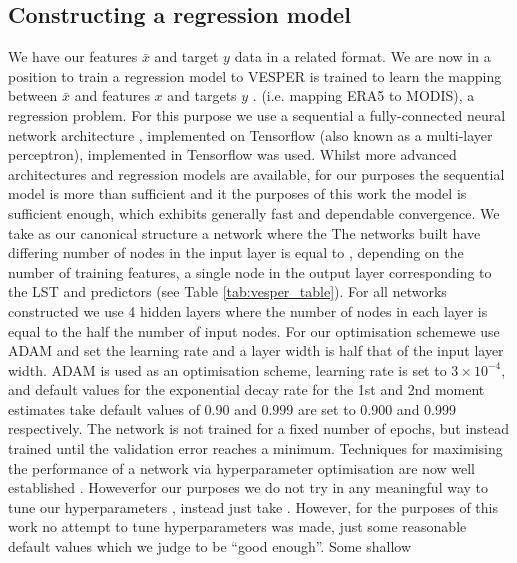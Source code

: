 \documentclass[hess, twostagejnl]{copernicus}
\providecommand{\DIFadd}[1]{{\protect\color{blue} \sf #1}} %
\providecommand{\DIFdel}[1]{{\protect\color{red} \scriptsize #1}} %
\providecommand{\DIFaddbegin}{} %
\providecommand{\DIFaddend}{} %
\providecommand{\DIFdelbegin}{} %
\providecommand{\DIFdelend}{} %
\begin{document}
\subsection{Constructing a regression model}
\DIFdelbegin \DIFdel{We have our features $\bar{x}$ and target $y$ data in a related format. We are now in a position to train a regression model to }\DIFdelend \DIFaddbegin \DIFadd{VESPER is trained to }\DIFaddend learn the mapping between \DIFdelbegin \DIFdel{$\bar{x}$ and }\DIFdelend \DIFaddbegin \DIFadd{features $x$ and targets }\DIFaddend $y$ \DIFdelbegin \DIFdel{. }\DIFdelend \DIFaddbegin \DIFadd{(i.e. mapping ERA5 to MODIS), a regression problem. }\DIFaddend For this purpose \DIFdelbegin \DIFdel{we use a sequential }\DIFdelend \DIFaddbegin \DIFadd{a fully-connected }\DIFaddend neural network architecture \DIFdelbegin \DIFdel{, implemented on Tensorflow \cite{tensorflow2015-whitepaper}}\DIFdelend \DIFaddbegin \DIFadd{(also known as a multi-layer perceptron), implemented in Tensorflow \citep{2016arXiv160304467A} was used}\DIFaddend . Whilst more advanced architectures \DIFdelbegin \DIFdel{and regression models }\DIFdelend are available, for \DIFdelbegin \DIFdel{our purposes the sequential model is more than sufficient and it }\DIFdelend \DIFaddbegin \DIFadd{the purposes of this work the model is sufficient enough, which }\DIFaddend exhibits generally fast and dependable convergence. \DIFdelbegin \DIFdel{We take as our canonical structure a network where the }\DIFdelend \DIFaddbegin \DIFadd{The networks built have differing }\DIFaddend number of nodes in the input layer\DIFdelbegin \DIFdel{is equal to }\DIFdelend \DIFaddbegin \DIFadd{, depending on }\DIFaddend the number of \DIFdelbegin \DIFdel{training features, a single node in the output layer corresponding to the LST and }\DIFdelend \DIFaddbegin \DIFadd{predictors (see Table \ref{tab:vesper_table}). For all networks constructed we use }\DIFaddend 4 hidden layers \DIFdelbegin \DIFdel{where the number of nodes in each layer is equal to the half the number of input nodes. For our optimisation schemewe use ADAM\cite{2014adam} and set the learning rate }\DIFdelend \DIFaddbegin \DIFadd{and a layer width is half that of the input layer width. ADAM \citep{2014adam} is used as an optimisation scheme, learning rate is set }\DIFaddend to $3 \times 10^{-4}$, and \DIFaddbegin \DIFadd{default values for }\DIFaddend the exponential decay rate for the 1st and 2nd moment estimates \DIFdelbegin \DIFdel{take default values of $0.90$ and $0.999$}\DIFdelend \DIFaddbegin \DIFadd{are set to 0.900 and 0.999 respectively}\DIFaddend . The network is not trained for a fixed number of epochs, but instead trained until the validation error reaches a minimum. Techniques for maximising the performance of a network via hyperparameter optimisation are now well established \DIFdelbegin \DIFdel{\cite{HPO1,HPO2}. Howeverfor our purposes we do not try in any meaningful way to tune our hyperparameters , instead just take }\DIFdelend \DIFaddbegin \DIFadd{\citep{HPO2,HPO1}. However, for the purposes of this work no attempt to tune hyperparameters was made, just }\DIFaddend some reasonable default values \DIFdelbegin \DIFdel{which we judge to be ``good enough''. Some shallow }\DIFdelend \DIFaddbegin 
\end{document}
